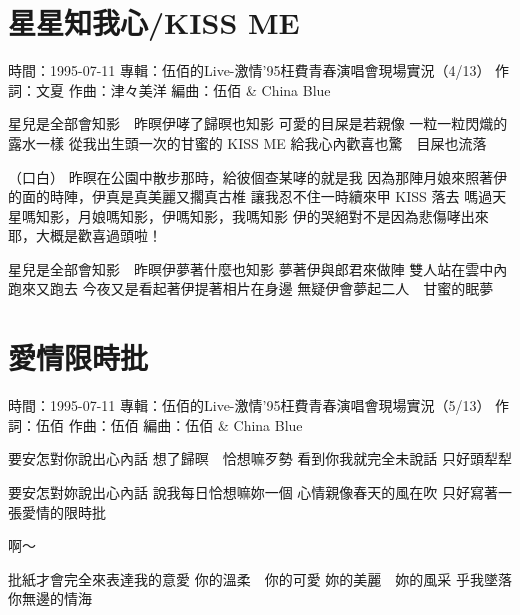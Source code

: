 \documentclass[UTF8,a4paper,oneside,twocolumn,12pt]{ctexbook}
\newcommand{\infopair}[2]{\textbullet #1：#2}
\newcommand{\zc}[1][伍佰]{\infopair{作詞}{#1}}
\newcommand{\zq}[1][伍佰]{\infopair{作曲}{#1}}
\newcommand{\bq}[1][伍佰]{\infopair{編曲}{#1}}
\newcommand{\zj}[1]{\infopair{專輯}{#1}}
\newcommand{\sj}[1]{\infopair{時間}{#1}}
\newenvironment{info}{\begin{flushleft}\kaishu
	}
	{\end{flushleft}\normalsize\yahei\par}
\newenvironment{lyric}{
	}
{}
\begin{document}
\section{星星知我心/KISS ME}
\begin{info}
	\sj{1995-07-11}
	\zj{伍佰的Live-激情'95枉費青春演唱會現場實況（4/13）}
	\zc[文夏] %
	\zq[津々美洋]
	\bq[伍佰 \& China Blue]
\end{info}
\begin{lyric}
	星兒是全部會知影　昨暝伊哮了歸暝也知影
	可愛的目屎是若親像
	一粒一粒閃熾的露水一樣
	從我出生頭一次的甘蜜的 KISS ME
	給我心內歡喜也驚　目屎也流落

	（口白）
	昨暝在公園中散步那時，給彼個查某哮的就是我
	因為那陣月娘來照著伊的面的時陣，伊真是真美麗又擱真古椎
	讓我忍不住一時續來甲 KISS 落去
	嗎過天星嗎知影，月娘嗎知影，伊嗎知影，我嗎知影
	伊的哭絕對不是因為悲傷哮出來耶，大概是歡喜過頭啦！

	星兒是全部會知影　昨暝伊夢著什麼也知影
	夢著伊與郎君來做陣
	雙人站在雲中內跑來又跑去
	今夜又是看起著伊提著相片在身邊
	無疑伊會夢起二人　甘蜜的眠夢
\end{lyric}

\section{愛情限時批}
\begin{info}
	\sj{1995-07-11}
	\zj{伍佰的Live-激情'95枉費青春演唱會現場實況（5/13）}
	\zc
	\zq
	\bq[伍佰 \& China Blue]
\end{info}
\begin{lyric}
	要安怎對你說出心內話
	想了歸暝　恰想嘛歹勢
	看到你我就完全未說話
	只好頭犁犁

	要安怎對妳說出心內話
	說我每日恰想嘛妳一個
	心情親像春天的風在吹
	只好寫著一張愛情的限時批

	啊～

	批紙才會完全來表達我的意愛
	你的溫柔　你的可愛  妳的美麗　妳的風采
	乎我墜落你無邊的情海
\end{lyric}
\end{document}
